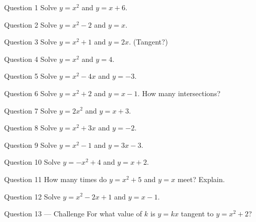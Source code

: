 \documentclass[11pt]{article}
\begin{document}
\begin{qbox}{Question 1}
Solve $y=x^2$ and $y=x+6$.\workspace{2.4cm}
\end{qbox}

\begin{qbox}{Question 2}
Solve $y=x^2-2$ and $y=x$.\workspace{2.4cm}
\end{qbox}

\begin{qbox}{Question 3}
Solve $y=x^2+1$ and $y=2x$. (Tangent?)\workspace{2.4cm}
\end{qbox}

\begin{qbox}{Question 4}
Solve $y=x^2$ and $y=4$.\workspace{2.2cm}
\end{qbox}

\begin{qbox}{Question 5}
Solve $y=x^2-4x$ and $y=-3$.\workspace{2.4cm}
\end{qbox}

\begin{qbox}{Question 6}
Solve $y=x^2+2$ and $y=x-1$. How many intersections?\workspace{2.4cm}
\end{qbox}

\begin{qbox}{Question 7}
Solve $y=2x^2$ and $y=x+3$.\workspace{2.6cm}
\end{qbox}

\begin{qbox}{Question 8}
Solve $y=x^2+3x$ and $y=-2$.\workspace{2.4cm}
\end{qbox}

\begin{qbox}{Question 9}
Solve $y=x^2-1$ and $y=3x-3$.\workspace{2.4cm}
\end{qbox}

\begin{qbox}{Question 10}
Solve $y=-x^2+4$ and $y=x+2$.\workspace{2.6cm}
\end{qbox}

\begin{qbox}{Question 11}
How many times do $y=x^2+5$ and $y=x$ meet? Explain.\workspace{2.2cm}
\end{qbox}

\begin{qbox}{Question 12}
Solve $y=x^2-2x+1$ and $y=x-1$.\workspace{2.4cm}
\end{qbox}

\begin{qbox}{Question 13 --- Challenge}
For what value of $k$ is $y=kx$ tangent to $y=x^2+2$?\workspace{2.8cm}
\end{qbox}
\end{document}
